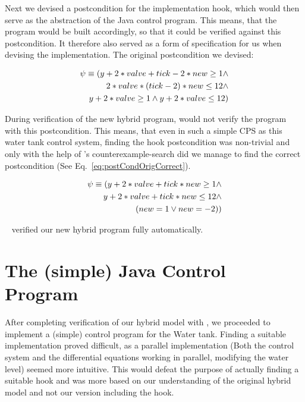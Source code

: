 Next we devised a postcondition for the implementation hook, which would then serve as the abstraction of the Java control program. This means, that the program would be built accordingly, so that it could be verified against this postcondition. It therefore also served as a form of specification for us when devising the implementation. The original postcondition we devised:

\begin{equation}
	\centering
	\begin{split}
		\psi \equiv (y + 2* valve + tick -2 * new  \geq 1 \wedge \\ 2 * valve * (tick - 2) * new \leq 12 \wedge \\  y + 2* valve \geq 1 \wedge  y + 2 * valve \leq 12) 
	\end{split}
\label{eq:postCondOrig}
\end{equation}

During verification of the new hybrid program, \keym would not verify the program with this postcondition. This means, that even in such a simple CPS as this water tank control system, finding the hook postcondition was non-trivial and only with the help of \keym's counterexample-search did we manage to find the correct postcondition (See Eq.~\ref{eq:postCondOrigCorrect}). 

\begin{equation}
	\centering
	\begin{split}
		\psi \equiv (y + 2 * valve + tick * new \geq 1 \wedge\\ y + 2 * valve + tick * new \leq 12 \wedge \\(new = 1  \vee new = -2))
	\end{split}
	\label{eq:postCondOrigCorrect}
\end{equation}

\keym~ verified our new hybrid program fully automatically.

\section{The (simple) Java Control Program}
\label{sec:Watertank:Java}

After completing verification of our hybrid model with \keym, we proceeded to implement a (simple) control program for the Water tank. Finding a suitable implementation proved difficult, as a parallel implementation (Both the control system and the differential equations working in parallel, modifying the water level) seemed more intuitive. This would defeat the purpose of actually finding a suitable hook and was more based on our understanding of the original hybrid model and not our version including the hook.


